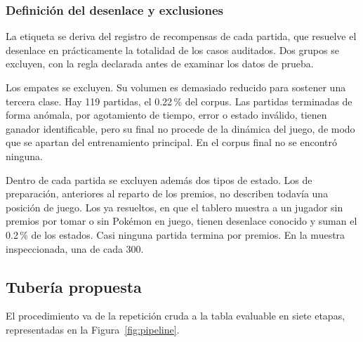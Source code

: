 \subsubsection{Definición del desenlace y exclusiones}

La etiqueta se deriva del registro de recompensas de cada partida, que
resuelve el desenlace en prácticamente la totalidad de los casos auditados.
Dos grupos se excluyen, con la regla declarada antes de examinar los datos
de prueba.

Los empates se excluyen. Su volumen es demasiado
reducido para sostener una tercera clase. Hay 119 partidas, el 0.22\,\% del
corpus. Las partidas terminadas de forma anómala, por agotamiento de tiempo,
error o estado inválido, tienen ganador identificable, pero su final no
procede de la dinámica del juego, de modo que se apartan del entrenamiento
principal. En el corpus final no se encontró ninguna.

Dentro de cada partida se excluyen además dos tipos de estado. Los de
preparación, anteriores al reparto de los premios, no describen todavía una
posición de juego. Los ya resueltos, en que el tablero muestra a un jugador
sin premios por tomar o sin Pok\'emon en juego, tienen desenlace conocido y
suman el 0.2\,\% de los estados. Casi ninguna partida termina por premios. En
la muestra inspeccionada, una de cada 300.

\subsection{Tubería propuesta}
\label{subsec:pipeline}

El procedimiento va de la repetición cruda a la tabla evaluable en siete
etapas, representadas en la Figura~\ref{fig:pipeline}.

